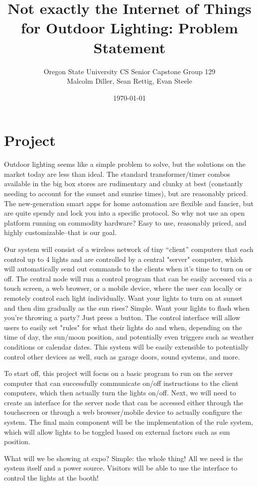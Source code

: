 \documentclass{article}
\title{Not exactly the Internet of Things for Outdoor Lighting: Problem Statement}
\author{Oregon State University CS Senior Capstone Group 129\\Malcolm Diller, Sean Rettig, Evan Steele}
\date{\today}
\begin{document}
\maketitle

\section{Project}

Outdoor lighting seems like a simple problem to solve, but the solutions on the
market today are less than ideal.  The standard transformer/timer combos
available in the big box stores are rudimentary and clunky at best (constantly
needing to account for the sunset and sunrise times), but are reasonably
priced. The new-generation smart apps for home automation are flexible and
fancier, but are quite spendy and lock you into a specific protocol.  So why
not use an open platform running on commodity hardware?  Easy to use,
reasonably priced, and highly customizable--that is our goal.

Our system will consist of a wireless network of tiny “client” computers that
each control up to 4 lights and are controlled by a central "server" computer,
which will automatically send out commands to the clients when it's time to
turn on or off.  The central node will run a control program that can be easily
accessed via a touch screen, a web browser, or a mobile device, where the user
can locally or remotely control each light individually.  Want your lights to
turn on at sunset and then dim gradually as the sun rises?  Simple.  Want your
lights to flash when you're throwing a party?  Just press a button.  The
control interface will allow users to easily set "rules" for what their lights
do and when, depending on the time of day, the sun/moon position, and
potentially even triggers such as weather conditions or calendar dates.  This
system will be easily extensible to potentially control other devices as well,
such as garage doors, sound systems, and more.

To start off, this project will focus on a basic program to run on the server
computer that can successfully communicate on/off instructions to the client
computers, which then actually turn the lights on/off.  Next, we will need to
create an interface for the server node that can be accessed either through the
touchscreen or through a web browser/mobile device to actually configure the
system.  The final main component will be the implementation of the rule
system, which will allow lights to be toggled based on external factors such as
sun position.

What will we be showing at expo?  Simple: the whole thing!  All we need is the
system itself and a power source.  Visitors will be able to use the interface
to control the lights at the booth!
\end{document}
